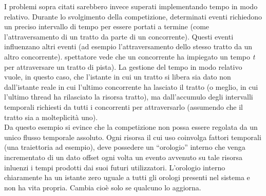 I problemi sopra citati sarebbero invece superati implementando tempo in modo
relativo. Durante lo svolgimento della competizione, 
determinati eventi richiedono un preciso
intervallo di tempo per essere portati a termine (come l'attraversamento di un
tratto da parte di un concorrente). 
Questi eventi influenzano altri eventi (ad esempio
l'attraversamento dello stesso tratto da un altro concorrente). 
spettatore vede che un concorrente ha impiegato un tempo \emph{t} per
attraversare un tratto di pista).
La gestione del tempo in modo relativo vuole, in questo caso, che l'istante in
cui un tratto si libera sia dato
non dall'istante reale in cui l'ultimo concorrente ha lasciato il tratto (o
meglio, in cui l'ultimo thread ha rilasciato
la risorsa tratto), ma dall'accumulo degli intervalli temporali richiesti da
tutti i concorrenti per attraversarlo (assumendo che il tratto
sia a molteplicità uno).\\
Da questo esempio si evince che la competizione non possa essere regolata da un
unico flusso temporale assoluto. Ogni risorsa il cui uso
coinvolga fattori temporali (una traiettoria ad esempio), deve
possedere un ``orologio'' interno che venga incrementato di un dato offset ogni
volta un evento avvenuto su tale risorsa inluenzi i tempi
prodotti dai suoi futuri utilizzatori. L'orologio interno chiaramente ha un
istante zero uguale a tutti gli orologi presenti nel sistema
e non ha vita propria. Cambia cioè solo se qualcuno lo aggiorna.\\
